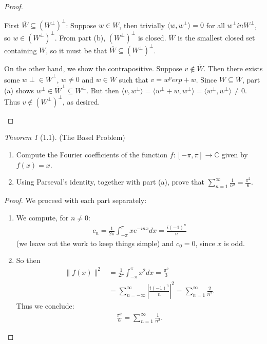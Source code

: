 \documentclass[12pt]{article}
\theoremstyle{remark}
\theoremstyle{named}
\newtheorem*{theorem}{Theorem}
\newcommand{\C}{\mathbb C}
\newcommand{\bigabs}[1]{\left|#1\right|}
\begin{document}
\begin{proof}
\begin{enumerate}
        First \(\overline W \subseteq (W^\perp)^\perp\): Suppose \(w \in W\), then trivially \(\langle w, w^\perp \rangle = 0\) for all \(w^\perp in W^\perp\), so \(w \in (W^\perp)^\perp\). From part (b), \((W^\perp)^\perp\) is closed. \(\overline W\) is the smallest closed set containing \(W\), so it must be that \(\overline W \subseteq (W^\perp)^\perp\).

        On the other hand, we show the contrapositive. Suppose \(v \notin \overline W\). Then there exists some \(w\perp \in \overline W^\perp\), \(w \neq 0\) and \(w \in \overline W\) such that \(v = w^perp + w\). Since \(W \subseteq \overline W\), part (a) shows \(w^\perp \in \overline W^\perp \subseteq W^\perp\). But then \(\langle v, w^\perp \rangle = \langle w^\perp + w, w^\perp \rangle = \langle w^\perp, w^\perp \rangle \neq 0\). Thus \(v \notin (W^\perp)^\perp\), as desired.
    \end{enumerate}
\end{proof}

\begin{theorem}[1.1]
    (The Basel Problem)
    \begin{enumerate}
        \item Compute the Fourier coefficients of the function \(f : [-\pi, \pi] \to \C\) given by \(f(x) = x\).
        \item Using Parseval's identity, together with part (a), prove that \(\sum_{n = 1}^\infty \frac{1}{n^2} = \frac{\pi^2}{6}\).
    \end{enumerate}
\end{theorem}

\begin{proof}
    We proceed with each part separately:
    \begin{enumerate}
        \item We compute, for \(n \neq 0\):
        \begin{align*}
            c_n = \frac{1}{2\pi} \int_{-\pi}^{\pi} x e^{-inx} dx = \frac{i(-1)^n}{n}
        \end{align*}
        (we leave out the work to keep things simple) and \(c_0 = 0\), since \(x\) is odd.
        \item So then
        \begin{align*}
            \|f(x)\|^2 &= \frac{1}{2\pi}\int_{-\pi}^{\pi} x^2 dx = \frac{\pi^2}{3} \\
            &= \sum_{n = -\infty}^{\infty} \bigabs{\frac{i (-1)^n}{n}}^2 = \sum_{n = 1}^{\infty} \frac{2}{n^2}.
        \end{align*}
        Thus we conclude:
        \begin{align*}
            \frac{\pi^2}{6} = \sum_{n = 1}^{\infty} \frac{1}{n^2}.
        \end{align*}
    \end{enumerate}
\end{proof}
\end{document}
